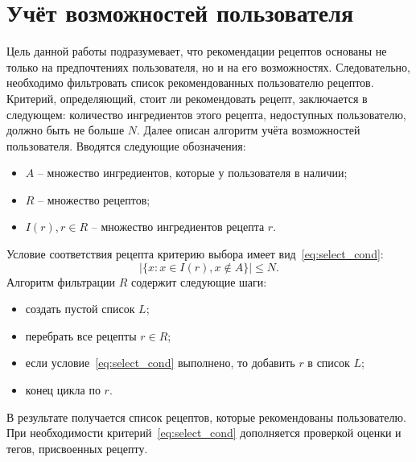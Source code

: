 \section{Учёт возможностей пользователя}
Цель данной работы подразумевает, что рекомендации рецептов основаны не только на предпочтениях пользователя, но и на его возможностях.
Следовательно, необходимо фильтровать список рекомендованных пользователю рецептов.
Критерий, определяющий, стоит ли рекомендовать рецепт, заключается в следующем: количество ингредиентов этого рецепта, недоступных пользователю, должно быть не больше $N$.
Далее описан алгоритм учёта возможностей пользователя.
Вводятся следующие обозначения:
\begin{itemize}
    \item $A$ -- множество ингредиентов, которые у пользователя в наличии;
    \item $R$ -- множество рецептов;
    \item $I(r), r \in R$ -- множество ингредиентов рецепта $r$.
\end{itemize}
Условие соответствия рецепта критерию выбора имеет вид~\eqref{eq:select_cond}:
\begin{equation}
	\label{eq:select_cond}
	|\{x: x \in I(r), x \notin A\}| \leqslant N.
\end{equation}
Алгоритм фильтрации $R$ содержит следующие шаги:
\begin{itemize}
    \item создать пустой список $L$;
    \item перебрать все рецепты $r \in R$;
    \item если условие~\ref{eq:select_cond} выполнено, то добавить $r$ в список $L$;
    \item конец цикла по $r$.
\end{itemize}
В результате получается список рецептов, которые рекомендованы пользователю.
При необходимости критерий~\eqref{eq:select_cond} дополняется проверкой оценки и тегов, присвоенных рецепту.